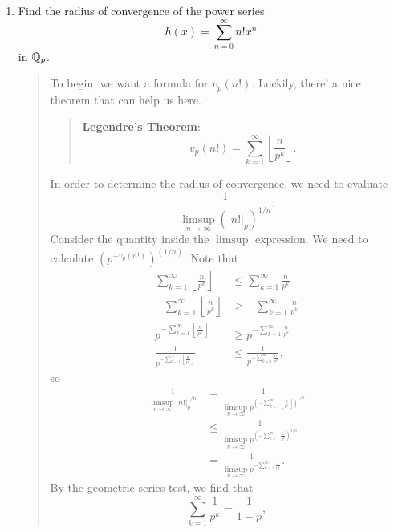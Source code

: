 \documentclass{hw}
\begin{document}
\begin{enumerate}
	\item Find the radius of convergence of the power series
	      \[
	      	h(x)=\sum_{n=0}^{\infty}n!x^{n}
	      \]
	      in $\mathbb{Q}_{p}$.
		  \begin{quote}
			  To begin, we want a formula for $v_{p}(n!)$. Luckily, there' a nice theorem that can help us here.
			  \begin{quote}
				  \textbf{Legendre's Theorem}:
				  \[
				  	v_{p}(n!)=\sum_{k=1}^{\infty}\left\lfloor\frac{n}{p^{k}}\right\rfloor.
				  \]
			  \end{quote}
			  In order to determine the radius of convergence, we need to evaluate
			  \[
			  	\frac{1}{\limsup_{n\to\infty}(|n!|_{p})^{1/n}}.
			  \]
			  Consider the quantity inside the $\limsup$ expression. We need to calculate $(p^{-v_{p}(n!)})^{(1/n)}$. Note that
			  \begin{align*}
				  \sum_{k=1}^{\infty}\left\lfloor\frac{n}{p^{k}}\right\rfloor &\leq \sum_{k=1}^{\infty}\frac{n}{p^{k}}\\
				  -\sum_{k=1}^{\infty}\left\lfloor\frac{n}{p^{k}}\right\rfloor &\geq -\sum_{k=1}^{\infty}\frac{n}{p^{k}}\\
				  p^{-\sum_{k=1}^{\infty}\left\lfloor\frac{n}{p^{k}}\right\rfloor} &\geq p^{-\sum_{k=1}^{\infty}\frac{n}{p^{k}}}\\
				  \frac{1}{p^{-\sum_{k=1}^{\infty}\left\lfloor\frac{n}{p^{k}}\right\rfloor}} &\leq \frac{1}{p^{-\sum_{k=1}^{\infty}\frac{n}{p^{k}}}},
			  \end{align*}
			  so
			  \begin{align*}
				  \frac{1}{\limsup_{n\to\infty}|n!|_{p}^{1/n}} &=
				  \frac{1}{\limsup_{n\to\infty}p^{\left(-\sum_{k=1}^{\infty}\left\lfloor\frac{n}{p^{k}}\right\rfloor\right)^{1/n}}}\\
				  &\leq \frac{1}{\limsup_{n\to\infty}p^{\left(-\sum_{k=1}^{\infty}\frac{n}{p^{k}}\right)^{1/n}}}\\
				  &= \frac{1}{\limsup_{n\to\infty}p^{-\sum_{k=1}^{\infty}\frac{1}{p^{k}}}}.
			  \end{align*}
			  By the geometric series test, we find that
			  \[
			  	\sum_{k=1}^{\infty}\frac{1}{p^k}=\frac{1}{1-p},
\]
\end{quote}
\end{enumerate}
\end{document}
